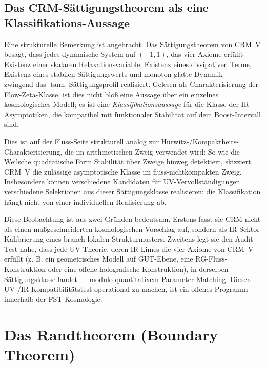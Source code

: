\documentclass[11pt]{article}
\theoremstyle{definition}
\theoremstyle{remark}
\begin{document}
\subsection{Das CRM-Sättigungstheorem als eine Klassifikations-Aussage}
\label{sec:crm-saturation-classification}

Eine strukturelle Bemerkung ist angebracht. Das Sättigungstheorem von CRM~V
\cite{CRMV} besagt, dass jedes dynamische System auf $(-1,1)$, das
vier Axiome erfüllt --- Existenz einer skalaren Relaxationsvariable, Existenz eines
dissipativen Terms, Existenz eines stabilen Sättigungswerts und
monoton glatte Dynamik --- zwingend das $\tanh$-Sättigungsprofil realisiert.
Gelesen als Charakterisierung der Flow-Zeta-Klasse, ist dies
nicht bloß eine Aussage über ein einzelnes kosmologisches Modell; es ist eine
\emph{Klassifikationsaussage} für die Klasse der IR-Asymptotiken, die
kompatibel mit funktionaler Stabilität auf dem Boost-Intervall sind.

Dies ist auf der Fluss-Seite strukturell analog zur Hurwitz-/Kompaktheits-Charakterisierung,
die im arithmetischen Zweig verwendet wird: So wie
die Weilsche quadratische Form Stabilität über Zweige hinweg detektiert,
skizziert CRM~V die zulässige asymptotische Klasse im fluss-nichtkompakten
Zweig. Insbesondere können verschiedene Kandidaten für UV-Vervollständigungen
verschiedene Selektionen aus dieser Sättigungsklasse realisieren; die
Klassifikation hängt nicht von einer individuellen Realisierung ab.

Diese Beobachtung ist aus zwei Gründen bedeutsam. Erstens fasst sie CRM
nicht als einen maßgeschneiderten kosmologischen Vorschlag auf, sondern als
IR-Sektor-Kalibrierung eines branch-lokalen Strukturmusters. Zweitens legt sie
den Audit-Test nahe, dass jede UV-Theorie,
deren IR-Limes die vier Axiome von CRM~V erfüllt (z. B. ein
geometrisches Modell auf GUT-Ebene, eine RG-Fluss-Konstruktion oder eine
offene holografische Konstruktion), in derselben Sättigungsklasse
landet --- modulo quantitativem Parameter-Matching. Diesen
UV-/IR-Kompatibilitätstest operational zu machen, ist ein offenes Programm innerhalb
der FST-Kosmologie.

\section{Das Randtheorem (Boundary Theorem)}
\label{sec:boundary}
\end{document}
